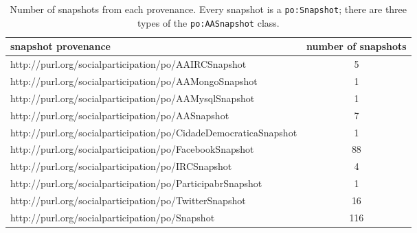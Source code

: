 \begin{table*}[h!]
\begin{center}
\caption{Number of snapshots from each provenance. Every snapshot is a \texttt{po:Snapshot}; there are three types of the \texttt{po:AASnapshot} class.}
\begin{tabular}{| l | c |}\hline
\textbf{snapshot provenance} & \textbf{number of snapshots} \\\hline\hline
http://purl.org/socialparticipation/po/AAIRCSnapshot & 5 \\\hline
http://purl.org/socialparticipation/po/AAMongoSnapshot & 1 \\\hline
http://purl.org/socialparticipation/po/AAMysqlSnapshot & 1 \\\hline
http://purl.org/socialparticipation/po/AASnapshot & 7 \\\hline
http://purl.org/socialparticipation/po/CidadeDemocraticaSnapshot & 1 \\\hline
http://purl.org/socialparticipation/po/FacebookSnapshot & 88 \\\hline
http://purl.org/socialparticipation/po/IRCSnapshot & 4 \\\hline
http://purl.org/socialparticipation/po/ParticipabrSnapshot & 1 \\\hline
http://purl.org/socialparticipation/po/TwitterSnapshot & 16 \\\hline\hline
http://purl.org/socialparticipation/po/Snapshot & 116 \\\hline
\end{tabular}\end{center}
\end{table*}